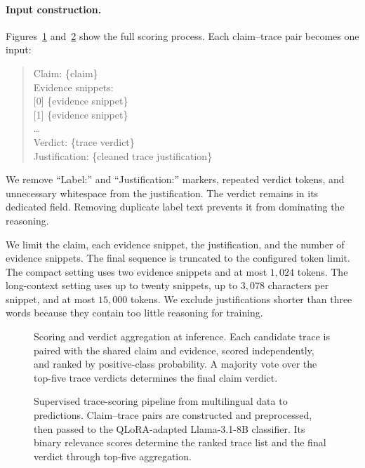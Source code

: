 \paragraph{Input construction.}
Figures~\ref{fig:supervised-trace-scorer} and~\ref{fig:supervised-trace-scorer-pipeline} show the full
scoring process. Each claim--trace pair becomes one input:
\begin{quote}\small\ttfamily
Claim: \{claim\}\\
Evidence snippets:\\
{}[0] \{evidence snippet\}\\
{}[1] \{evidence snippet\}\\
\dots\\
Verdict: \{trace verdict\}\\
Justification: \{cleaned trace justification\}
\end{quote}

We remove ``Label:'' and ``Justification:'' markers, repeated verdict tokens, and unnecessary
whitespace from the justification. The verdict remains in its dedicated field. Removing duplicate
label text prevents it from dominating the reasoning.

We limit the claim, each evidence snippet, the justification, and the number of evidence snippets.
The final sequence is truncated to the configured token limit. The compact setting uses two evidence
snippets and at most $1{,}024$ tokens. The long-context setting uses up to twenty snippets, up to
$3{,}078$ characters per snippet, and at most $15{,}000$ tokens. We exclude justifications shorter
than three words because they contain too little reasoning for training.

\begin{figure}[htbp]
\centering
  
\caption{Scoring and verdict aggregation at inference. Each candidate trace is paired with the shared
claim and evidence, scored independently, and ranked by positive-class probability. A majority vote
over the top-five trace verdicts determines the final claim verdict.}
\label{fig:supervised-trace-scorer}
\end{figure}

\begin{figure}[htbp]
\centering
  
\caption{Supervised trace-scoring pipeline from multilingual data to predictions. Claim--trace pairs
are constructed and preprocessed, then passed to the QLoRA-adapted Llama-3.1-8B classifier. Its binary
relevance scores determine the ranked trace list and the final verdict through top-five aggregation.}
\label{fig:supervised-trace-scorer-pipeline}
\end{figure}

